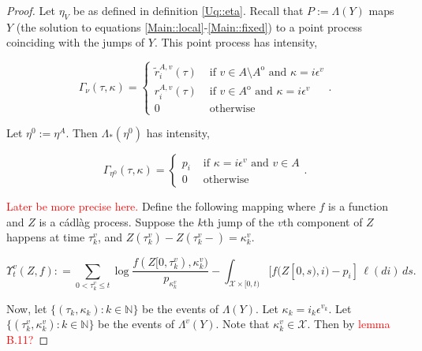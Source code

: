 \documentclass[12pt]{article}
\newcommand{\mb}{\mathbb}
\newcommand{\mc}{\mathcal}
\newcommand{\te}{\text}
\newcommand{\ep}{\epsilon}
\newcommand{\tr}{\textcolor{red}}
\newcommand{\defeq}{:=}								%
\newcommand{\sta}{\mc{X}}							%
\newcommand{\indx}[1]{^{#1}}						%
\newcommand{\Sm}{\ell}								%
\newcommand{\rate}{r}								%
\newcommand{\vind}[1]{_{#1}}						%
\newcommand{\tme}[1]{(#1)}							%
\newcommand{\tmi}[1]{#1}							%
\newcommand{\vpara}[1]{^{#1}}						%
\newcommand{\stpara}[1]{_{#1}}						%
\newcommand{\tpara}[1]{_{#1}}						%
\newcommand{\gvpara}[2]{^{#1,#2}}					%
\newcommand{\psf}{_*}								%
\newcommand{\Xg}{Y}									%
\newcommand{\brate}{\alt{\rate}}					%
\newcommand{\inte}[1]{{#1}^\mathrm{o}}				%
\newcommand{\alt}[1]{\tilde{#1}}					%
\newcommand{\pmap}{\Lambda}							%
\newcommand{\rt}{\tau}								%
\renewcommand{\mark}{\kappa}						%
\newcommand{\ratee}{\Gamma}							%
\newcommand{\rp}{P}									%
\newcommand{\mm}{\nu}								%
\newcommand{\ev}[1]{\ep^{#1}}						%
\newcommand{\Xh}{Z}									%
\newcommand{\mmm}{\eta}								%
\newcommand{\ds}{\Upsilon}							%
\newcommand{\prc}[1]{_{#1}}							%
\renewcommand{\it}[1]{_{#1}}						%
\begin{document}
\begin{proof}
Let \(\mmm\vind{V}\) be as defined in definition \ref{Uq::eta}. Recall that \(\rp\defeq \pmap(\Xg)\) maps \(\Xg\) (the solution to equations \eqref{Main::local}-\eqref{Main::fixed}) to a point process coinciding with the jumps of \(\Xg\). This point process has intensity,

\[\ratee\prc{\mm}(\rt,\mark) = \begin{cases}
\brate\gvpara{A}{v}\stpara{i}\tme{\rt} &\te{ if } v \in A\setminus\inte{A}\te{ and } \mark = i\ev{v}\\
\rate\gvpara{A}{v}\stpara{i}\tme{\rt} &\te{ if } v \in \inte{A}\te{ and } \mark = i\ev{v}\\
0 &\te{ otherwise}
\end{cases}.\]

Let \(\mmm\indx{0} \defeq \mmm\vpara{A}\). Then \(\pmap\psf(\mmm\indx{0})\) has intensity,

\[\ratee\prc{\mmm\indx{0}}(\rt,\mark) = 
\begin{cases}
p_i &\te{ if } \mark= i\ev{v}\te{ and } v\in A\\
0 &\te{ otherwise}
\end{cases}.\]

\tr{Later be more precise here.} Define the following mapping where \(f\) is a function and \(\Xh\) is a c\'adl\`ag process. Suppose the \(k\)th jump of the \(v\)th component of \(\Xh\) happens at time \(\rt\vpara{v}\it{k}\), and \(\Xh\tme{\rt\vpara{v}\it{k}} - \Xh\tme{\rt\vpara{v}\it{k}-} = \mark\vpara{v}\it{k}\). 

\begin{equation}
\ds\vpara{v}\tpara{t}(\Xh,f): = \sum_{0 < \rt\vpara{v}\it{k}\leq t} \log \frac{f(\Xh\tmi{[0,\rt\vpara{v}\it{k})},\mark\vpara{v}\it{k})}{p\it{\mark\vpara{v}\it{k}}} - \int_{\sta\times[0,t)} [f(\Xh\tmi{[0,s)},i) - p\it{i}]\,\Sm(di)\,ds.
\label{Uq::ds}
\end{equation}

Now, let \(\{(\rt\it{k},\mark\it{k}):k\in\mb{N}\}\) be the events of \(\pmap(\Xg)\). Let \(\mark\it{k} = i\it{k}\ev{v\it{k}}\). Let \(\{(\rt\it{k}\vpara{v},\mark\it{k}\vpara{v}):k\in\mb{N}\}\) be the events of \(\pmap\vpara{v}(\Xg)\). Note that \(\mark\it{k}\vpara{v} \in \sta\). Then by \tr{lemma B.11?}


\end{proof}
\end{document}
